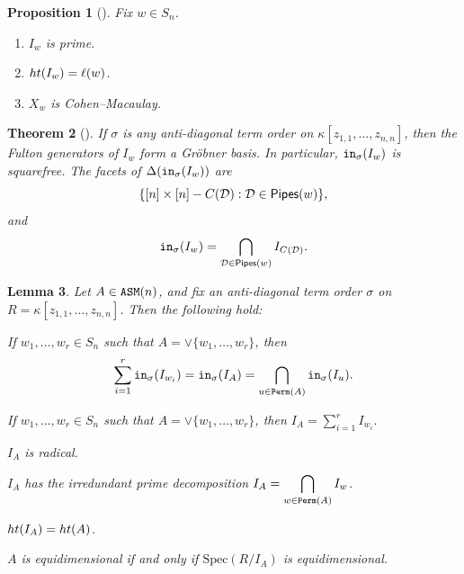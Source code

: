 \documentclass[10pt,a4paper]{amsart}
\newtheorem{theorem}{Theorem}[section]
\newtheorem{proposition}[theorem]{Proposition}
\newtheorem{lemma}[theorem]{Lemma}
\newtheorem{Main Conjecture}[theorem]{Main Conjecture}
\theoremstyle{remark}
\theoremstyle{plain}
\newcommand{\init}{{\tt in}}
\newcommand{\pipes}{{\sf Pipes}}
\newcommand{\hgt}{{\rm{ht }}}
\newcommand{\perm}{{\tt Perm}}
\newcommand{\asm}{{\tt ASM}}
\newcommand{\spec}{{\mbox{Spec}}}
\begin{document}
\setcounter{section}{2}
\setcounter{theorem}{2}
\begin{proposition}[{\cite[Proposition~3.3]{Ful92}}]
\label{prop:matSchubFacts}
	Fix $w\in S_n$.
	\begin{enumerate}
		\item $I_w$ is prime.
		\item $\hgt (I_w)=\ell(w)$.
		\item $X_w$ is Cohen--Macaulay.
	\end{enumerate}
\end{proposition}

\setcounter{theorem}{3}
\begin{theorem}[{\cite[Theorem~B]{KM05}}]
\label{theorem:KMTheoremB}
If $\sigma$ is any anti-diagonal term order on $\kappa[z_{1,1}, \ldots, z_{n,n}]$, then the Fulton generators of $I_w$ 
form a Gr\"obner basis.  In particular,  $\init_\sigma(I_w)$ is squarefree.  The facets of $\Delta(\init_\sigma(I_w))$ are \[\{[n]\times[n] - C(\mathcal D):\mathcal D\in \pipes(w)\},\]
and \[\init_\sigma(I_w)=\bigcap_{\mathcal D\in \pipes(w)} I_{C(\mathcal D)}.\]
\end{theorem}

\setcounter{theorem}{5}
\begin{lemma}\label{lemma:asmIdealFacts}
Let $A\in \asm(n)$, and fix an anti-diagonal term order $\sigma$ on $ R = \kappa[z_{1,1},\ldots,z_{n,n}]$.   Then the following hold:
\begin{thmlist}
\item  If $w_1,\ldots,w_r\in S_n$ such that $A=\vee\{w_1,\ldots,w_r\}$, then
\[ \sum_{i=1}^r \init_\sigma(I_{w_i})=\init_\sigma(I_A)=\bigcap_{u\in \perm(A)} \init_\sigma(I_u).\]
\label{lempart:intersectInit}
    

     
    \item If $w_1,\ldots,w_r\in S_n$ such that $A=\vee\{w_1,\ldots,w_r\}$, then $ I_A={\displaystyle \sum_{i=1}^r} I_{w_i}.$ \label{lempart:addIwi}
    
     \item $I_A$ is radical. \label{lempart:asmRad}
    
   \item $I_A$ has the irredundant prime decomposition $\displaystyle I_A=\bigcap_{w\in \perm(A)}I_w$. \label{lempart:asmDecomp}
   
\item $\hgt (I_A)=\hgt(A)$. \label{lempart:asmHeight}

		\item $A$ is equidimensional if and only if $\spec(R/I_A)$ is equidimensional. \label{lempart:asmEquidim}
\end{thmlist}
\end{lemma}
\end{document}

